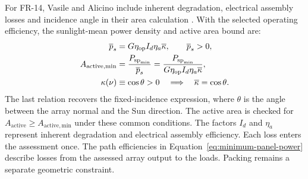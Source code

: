 For FR-14, Vasile and Alicino include inherent degradation, electrical assembly losses and incidence angle in their area calculation \citep[Sec.~II.1]{review-1542}. With the selected operating efficiency, the sunlight-mean power density and active area bound are:
\begin{align}
    \overline p_s&=G\eta_{\mathrm{op}}I_d\eta_a\overline\kappa,
    \qquad \overline p_s>0,
    \label{eq:array-mean-power-density} \\
    A_{\mathrm{active,min}}
    &=\frac{P_{\mathrm{sp}_{\min}}}{\overline p_s}
    =\frac{P_{\mathrm{sp}_{\min}}}
      {G\eta_{\mathrm{op}}I_d\eta_a\overline\kappa},
    \label{eq:array-incidence-area} \\
    \kappa(\nu)&\equiv\cos\theta>0
    \quad\Longrightarrow\quad\overline\kappa=\cos\theta.
    \notag
\end{align}
The last relation recovers the fixed-incidence expression, where $\theta$ is the angle between the array normal and the Sun direction.
The active area is checked for $A_{\mathrm{active}}\geq A_{\mathrm{active,min}}$ under these common conditions. The factors $I_d$ and $\eta_a$ represent inherent degradation and electrical assembly efficiency. Each loss enters the assessment once. The path efficiencies in Equation~\eqref{eq:minimum-panel-power} describe losses from the assessed array output to the loads. Packing remains a separate geometric constraint.

